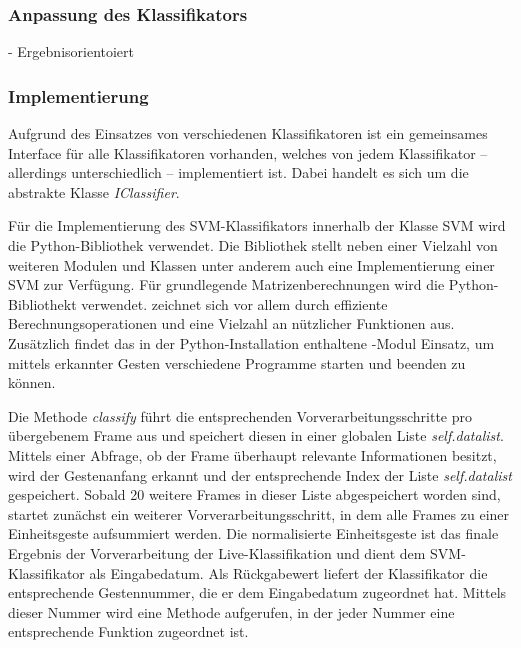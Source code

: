 \subsubsection{Anpassung des Klassifikators}
- Ergebnisorientoiert

\subsubsection{Implementierung}
Aufgrund des Einsatzes von verschiedenen Klassifikatoren ist ein gemeinsames Interface für alle Klassifikatoren vorhanden, welches von jedem Klassifikator -- allerdings unterschiedlich -- implementiert ist. 
Dabei handelt es sich um die abstrakte Klasse \textit{IClassifier}.

Für die Implementierung des \ac{SVM}-Klassifikators innerhalb der Klasse SVM wird die Python-Bibliothek \cite{scikit-learn} verwendet. 
Die Bibliothek stellt neben einer Vielzahl von weiteren Modulen und Klassen unter anderem auch eine Implementierung einer SVM zur Verfügung.
Für grundlegende Matrizenberechnungen wird die Python-Bibliothekt \cite{NumPy} verwendet. \cite{NumPy} zeichnet sich vor allem durch effiziente Berechnungsoperationen und eine Vielzahl an nützlicher Funktionen aus.
Zusätzlich findet das in der Python-Installation enthaltene \cite{subprocess}-Modul Einsatz, um mittels erkannter Gesten verschiedene Programme starten und beenden zu können.

Die Methode \textit{classify} führt die entsprechenden Vorverarbeitungsschritte pro übergebenem Frame aus und speichert diesen in einer globalen Liste \textit{self.datalist}. 
Mittels einer Abfrage, ob der Frame überhaupt relevante Informationen besitzt, wird der Gestenanfang erkannt und der entsprechende Index der Liste \textit{self.datalist} gespeichert.
Sobald 20 weitere Frames in dieser Liste abgespeichert worden sind, startet zunächst ein weiterer Vorverarbeitungsschritt, in dem alle Frames zu einer Einheitsgeste aufsummiert werden.
Die normalisierte Einheitsgeste ist das finale Ergebnis der Vorverarbeitung der Live-Klassifikation und dient dem SVM-Klassifikator als Eingabedatum.
Als Rückgabewert liefert der Klassifikator die entsprechende Gestennummer, die er dem Eingabedatum zugeordnet hat.
Mittels dieser Nummer wird eine Methode aufgerufen, in der jeder Nummer eine entsprechende Funktion zugeordnet ist.

